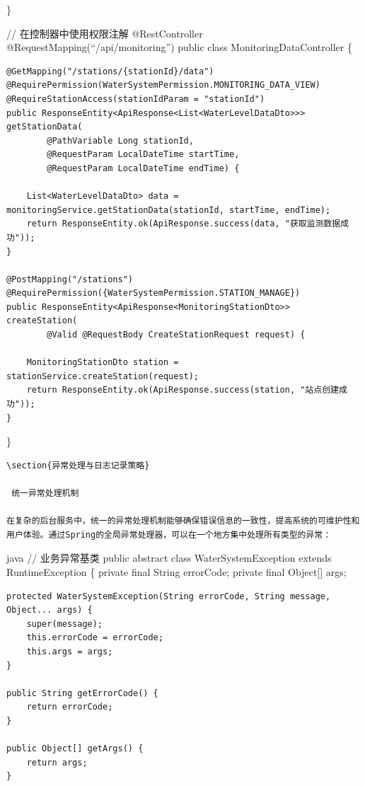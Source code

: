 \}

// 在控制器中使用权限注解 @RestController @RequestMapping(``/api/monitoring'') public class MonitoringDataController \{

\begin{verbatim}
@GetMapping("/stations/{stationId}/data")
@RequirePermission(WaterSystemPermission.MONITORING_DATA_VIEW)
@RequireStationAccess(stationIdParam = "stationId")
public ResponseEntity<ApiResponse<List<WaterLevelDataDto>>> getStationData(
        @PathVariable Long stationId,
        @RequestParam LocalDateTime startTime,
        @RequestParam LocalDateTime endTime) {
    
    List<WaterLevelDataDto> data = monitoringService.getStationData(stationId, startTime, endTime);
    return ResponseEntity.ok(ApiResponse.success(data, "获取监测数据成功"));
}

@PostMapping("/stations")
@RequirePermission({WaterSystemPermission.STATION_MANAGE})
public ResponseEntity<ApiResponse<MonitoringStationDto>> createStation(
        @Valid @RequestBody CreateStationRequest request) {
    
    MonitoringStationDto station = stationService.createStation(request);
    return ResponseEntity.ok(ApiResponse.success(station, "站点创建成功"));
}
\end{verbatim}

\}

\begin{lstlisting}
\section{异常处理与日志记录策略}

 统一异常处理机制

在复杂的后台服务中，统一的异常处理机制能够确保错误信息的一致性，提高系统的可维护性和用户体验。通过Spring的全局异常处理器，可以在一个地方集中处理所有类型的异常：
\end{lstlisting}

java // 业务异常基类 public abstract class WaterSystemException extends RuntimeException \{ private final String errorCode; private final Object{[}{]} args;

\begin{verbatim}
protected WaterSystemException(String errorCode, String message, Object... args) {
    super(message);
    this.errorCode = errorCode;
    this.args = args;
}

public String getErrorCode() {
    return errorCode;
}

public Object[] getArgs() {
    return args;
}
\end{verbatim}

